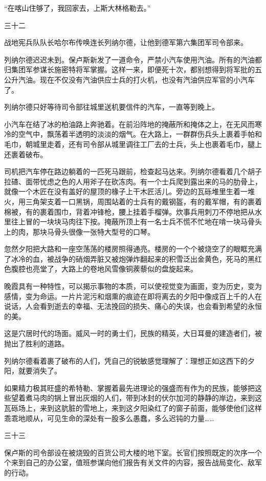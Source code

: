 “在喀山住够了，我回家去，上斯大林格勒去。”

三十二

战地宪兵队队长哈尔布传唤连长列纳尔德，让他到德军第六集团军司令部来。

列纳尔德迟迟未到。保卢斯新发了一道命令，严禁小汽车使用汽油。所有的汽油都归集团军参谋长施密特将军掌握。这样一来，即便死十次，都别想得到将军批的五公升汽油。现在不仅没有汽油供应士兵的打火机，也没有汽油供应军官的小汽车了。

列纳尔德只好等待司令部往城里送机要信件的汽车，一直等到晚上。

小汽车在结了冰的柏油路上奔驰着。在前沿阵地的掩蔽所和掩体之上，在无风而寒冷的空气中，飘荡着半透明的淡淡的烟气。在大路上，一群群伤兵头上裹着手帕和毛巾，朝城里走着，还有司令部从城里调往工厂去的士兵，头上也裹着毛巾，腿上还裹着破布。

司机把汽车停在路边躺着的一匹死马跟前，检查起马达来。列纳尔德看着几个胡子拉碴、面带忧虑之色的人用斧子在砍冻肉。有一个士兵爬到露出来的马的肋骨上，就像一个木匠在没有盖好的屋顶的椽子上干木匠活儿。旁边的瓦砾堆里生着一堆火，用三角架支着一口黑锅，周围站着的士兵有的戴钢盔，有的戴军帽，有的裹着棉被，有的裹着围巾，背着冲锋枪，腰上挂着手榴弹。炊事兵用刺刀不停地把从水里往上冒的一块块马肉往下按。掩蔽所顶上有一名士兵不慌不忙地在啃一块马骨头上的肉，那块马骨头很像一张特大型号的口琴。

忽然夕阳把大路和一座空荡荡的楼房照得通亮。楼房的一个个被烧空了的眼眶充满了冰冷的血，被战争的硝烟弄脏又被炮弹炸翻起来的积雪泛出金黄色，死马的黑红色腹腔也亮堂了，大路上的卷地风雪像铜蒺藜似的盘旋起来。

晚霞具有一种特性，可以揭示事物的本质，可以使视觉变为画面，变为历史，变为感情，变为命运。一片片泥污和烟熏的痕迹在即将离去的夕阳中像成百上千的人在说话，人会看到逝去的幸福、无法挽回的损失、痛心的失误，也会看到希望的永恒的美。

这是穴居时代的场面。威风一时的勇士们，民族的精英，大日耳曼的建造者们，被抛出了胜利的道路。

列纳尔德看着裹了破布的人们，凭自己的锐敏感觉理解了：理想正如这西下的夕阳，就要消失了。

如果精力极其旺盛的希特勒、掌握着最先进理论的强盛而有作为的民族，能够把这些望着煮马肉的锅上冒出灰烟的人们，带到冰封的伏尔加河的静静的岸边，来到这瓦砾场上，来到这肮脏的雪地上，来到这夕阳染红了的窗子前面，能够使他们这样乖乖地顺从，可见生命的深处有一股多么愚蠢，多么迟钝的力量……

三十三

保卢斯的司令部设在被烧毁的百货公司大楼的地下室。长官们按照既定的次序一个个来到自己的办公室，值班参谋向他们报告有关文件的内容，报告战局变化、敌军的行动。

